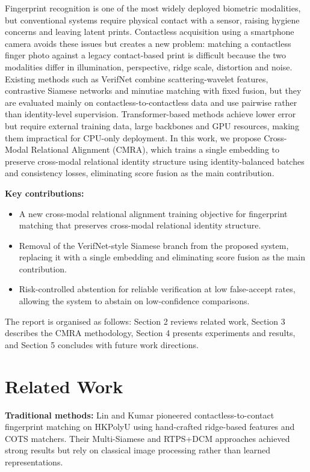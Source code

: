 \documentclass[12pt,a4paper]{article}
\begin{document}
Fingerprint recognition is one of the most widely deployed biometric modalities, but conventional systems require physical contact with a sensor, raising hygiene concerns and leaving latent prints. Contactless acquisition using a smartphone camera avoids these issues but creates a new problem: matching a contactless finger photo against a legacy contact-based print is difficult because the two modalities differ in illumination, perspective, ridge scale, distortion and noise. Existing methods such as VerifNet combine scattering-wavelet features, contrastive Siamese networks and minutiae matching with fixed fusion, but they are evaluated mainly on contactless-to-contactless data and use pairwise rather than identity-level supervision. Transformer-based methods achieve lower error but require external training data, large backbones and GPU resources, making them impractical for CPU-only deployment. In this work, we propose Cross-Modal Relational Alignment (CMRA), which trains a single embedding to preserve cross-modal relational identity structure using identity-balanced batches and consistency losses, eliminating score fusion as the main contribution.

\textbf{Key contributions:}
\begin{itemize}[leftmargin=*]
    \item A new cross-modal relational alignment training objective for fingerprint matching that preserves cross-modal relational identity structure.
    \item Removal of the VerifNet-style Siamese branch from the proposed system, replacing it with a single embedding and eliminating score fusion as the main contribution.
    \item Risk-controlled abstention for reliable verification at low false-accept rates, allowing the system to abstain on low-confidence comparisons.
\end{itemize}

The report is organised as follows: Section 2 reviews related work, Section 3 describes the CMRA methodology, Section 4 presents experiments and results, and Section 5 concludes with future work directions.

\section{Related Work}

\textbf{Traditional methods:} Lin and Kumar pioneered contactless-to-contact fingerprint matching on HKPolyU using hand-crafted ridge-based features and COTS matchers. Their Multi-Siamese and RTPS+DCM approaches achieved strong results but rely on classical image processing rather than learned representations.
\end{document}
